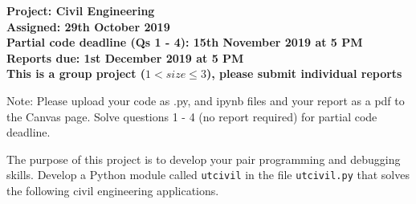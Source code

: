 \documentclass[a4paper,12pt]{article}
\begin{document}
\begin{centering}
	\textbf{
		Project: Civil Engineering\\
		Assigned: 29th October 2019\\
		Partial code deadline (Qs 1 - 4): 15th November 2019 at 5 PM\\
		Reports due: 1st December 2019 at 5 PM\\
		This is a group project ($ 1 < size \le 3$), please submit individual reports\\
	}
\end{centering}


\vspace{1em}

Note: Please upload your code as .py, and ipynb files and your report as a pdf to the Canvas page. Solve questions 1 - 4 (no report required) for partial code deadline.

\vspace{1em}
 
 The purpose of this project is to develop your pair programming and debugging skills. Develop a Python module called \verb|utcivil| in the file  \verb|utcivil.py| that solves the following civil engineering applications.
 
\end{document}
